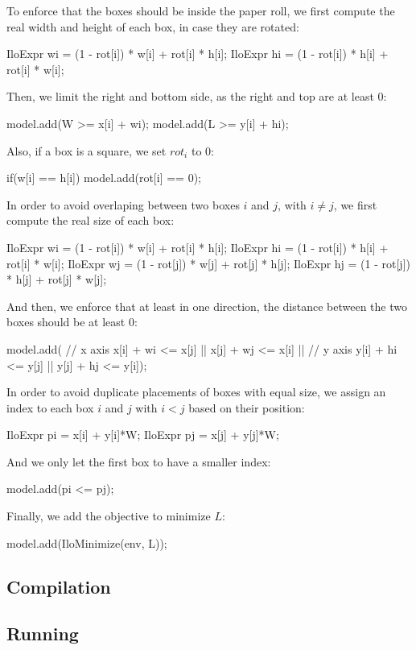 \documentclass[a4paper]{article}
\begin{document}
To enforce that the boxes should be inside the paper roll, we first compute the 
real width and height of each box, in case they are rotated:
%
\begin{cppcode}
IloExpr wi = (1 - rot[i]) * w[i] + rot[i] * h[i];
IloExpr hi = (1 - rot[i]) * h[i] + rot[i] * w[i];
\end{cppcode}
%
Then, we limit the right and bottom side, as the right and top are at least 0:
%
\begin{cppcode}
model.add(W >= x[i] + wi);
model.add(L >= y[i] + hi);
\end{cppcode}
%
Also, if a box is a square, we set $rot_i$ to 0:
%
\begin{cppcode}
if(w[i] == h[i]) model.add(rot[i] == 0);
\end{cppcode}
%
In order to avoid overlaping between two boxes $i$ and $j$, with $i \neq j$, we 
first compute the real size of each box:
%
\begin{cppcode}
IloExpr wi = (1 - rot[i]) * w[i] + rot[i] * h[i];
IloExpr hi = (1 - rot[i]) * h[i] + rot[i] * w[i];
IloExpr wj = (1 - rot[j]) * w[j] + rot[j] * h[j];
IloExpr hj = (1 - rot[j]) * h[j] + rot[j] * w[j];
\end{cppcode}
%
And then, we enforce that at least in one direction, the distance between the 
two boxes should be at least 0:
%
\begin{cppcode}
model.add(
		// x axis
		x[i] + wi <= x[j] || 
		x[j] + wj <= x[i] ||
		// y axis
		y[i] + hi <= y[j] ||
		y[j] + hj <= y[i]);
\end{cppcode}
%
In order to avoid duplicate placements of boxes with equal size, we assign an 
index to each box $i$ and $j$ with $i < j$ based on their position:
%
\begin{cppcode}
IloExpr pi = x[i] + y[i]*W;
IloExpr pj = x[j] + y[j]*W;
\end{cppcode}
%
And we only let the first box to have a smaller index:
%
\begin{cppcode}
model.add(pi <= pj);
\end{cppcode}
%
Finally, we add the objective to minimize $L$:
%
\begin{cppcode}
model.add(IloMinimize(env, L));
\end{cppcode}

\subsection{Compilation}

\subsection{Running}
\end{document}
